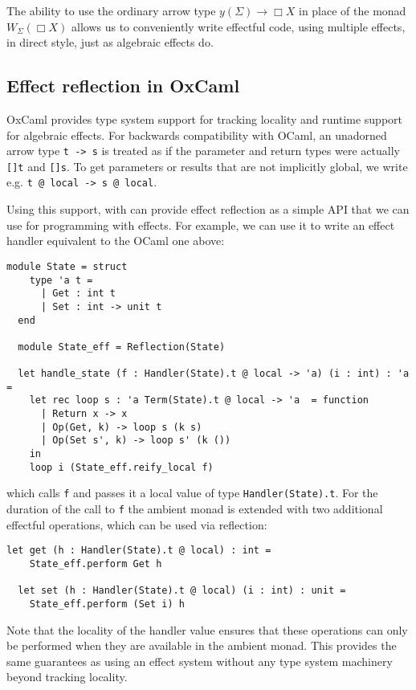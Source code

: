 \documentclass[acmsmall, screen, nonacm]{acmart}
\theoremstyle{definition}
\newcommand{\glob}{\mathop{\Box}}
\newcommand{\yoneda}[1]{y(#1)}
\newcommand{\ind}[1]{W_{#1}}
\begin{document}
The ability to use the ordinary arrow type
$\yoneda{\Sigma} \mathbin{\rightarrow} \glob X$ in place of the monad
$\ind{\Sigma}(\glob X)$ allows us to conveniently write effectful code,
using multiple effects, in direct style, just as algebraic effects do.

\subsection{Effect reflection in OxCaml}
OxCaml\cite{lorenzen2024oxidizing} provides type system support for
tracking locality and runtime support for algebraic effects. For
backwards compatibility with OCaml, an unadorned arrow type
\lstinline[style=oxcaml]{t -> s} is treated as if the parameter and
return types were actually \lstinline[style=oxcaml]{[]t} and
\lstinline[style=oxcaml]{[]s}. To get parameters or results that are not
implicitly global, we write
e.g. \lstinline[style=oxcaml]{t @ local -> s @ local}.

Using this support, with can provide effect reflection as a simple API
that we can use for programming with effects.  For example, we can use
it to write an effect handler equivalent to the OCaml one above:
\begin{lstlisting}[style=oxcaml]
  module State = struct
    type 'a t =
      | Get : int t
      | Set : int -> unit t
  end

  module State_eff = Reflection(State)

  let handle_state (f : Handler(State).t @ local -> 'a) (i : int) : 'a =
    let rec loop s : 'a Term(State).t @ local -> 'a  = function
      | Return x -> x
      | Op(Get, k) -> loop s (k s)
      | Op(Set s', k) -> loop s' (k ())
    in
    loop i (State_eff.reify_local f)
\end{lstlisting}
which calls \lstinline[style=oxcaml]{f} and passes it a local value of
type \lstinline[style=oxcaml]{Handler(State).t}. For the duration of the
call to \lstinline[style=oxcaml]{f} the ambient monad is extended with
two additional effectful operations, which can be used via reflection:
\begin{lstlisting}[style=oxcaml]
  let get (h : Handler(State).t @ local) : int =
    State_eff.perform Get h

  let set (h : Handler(State).t @ local) (i : int) : unit =
    State_eff.perform (Set i) h
\end{lstlisting}

Note that the locality of the handler value ensures that these
operations can only be performed when they are available in the ambient
monad. This provides the same guarantees as using an effect system
without any type system machinery beyond tracking locality.
\end{document}
